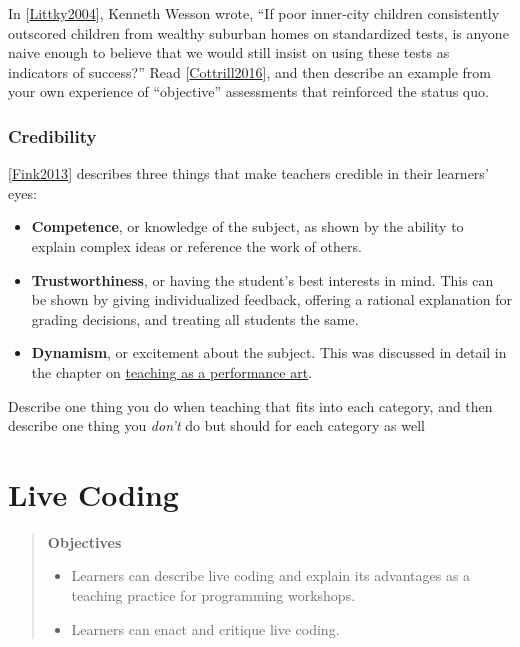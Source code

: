 \documentclass[10pt,statementpaper]{memoir}
\providecommand{\tightlist}{%
  \setlength{\itemsep}{0pt}\setlength{\parskip}{0pt}}
\begin{document}
In {[}\href{biblio.html\#littky-big-picture}{Littky2004}{]}, Kenneth
Wesson wrote, ``If poor inner-city children consistently outscored
children from wealthy suburban homes on standardized tests, is anyone
naive enough to believe that we would still insist on using these tests
as indicators of success?'' Read
{[}\href{biblio.html\#cottrill-gifted}{Cottrill2016}{]}, and then
describe an example from your own experience of ``objective''
assessments that reinforced the status quo.

\subsection*{Credibility}\label{credibility}

{[}\href{biblio.html\#fink-significant}{Fink2013}{]} describes three
things that make teachers credible in their learners' eyes:

\begin{itemize}
\item
  \textbf{Competence}, or knowledge of the subject, as shown by the
  ability to explain complex ideas or reference the work of others.
\item
  \textbf{Trustworthiness}, or having the student's best interests in
  mind. This can be shown by giving individualized feedback, offering a
  rational explanation for grading decisions, and treating all students
  the same.
\item
  \textbf{Dynamism}, or excitement about the subject. This was discussed
  in detail in the chapter on \href{performance.html}{teaching as a
  performance art}.
\end{itemize}

Describe one thing you do when teaching that fits into each category,
and then describe one thing you \emph{don't} do but should for each
category as well

\chapter{Live Coding}\label{live-coding}

\begin{quote}
\textbf{Objectives}

\begin{itemize}
\tightlist
\item
  Learners can describe live coding and explain its advantages as a
  teaching practice for programming workshops.
\item
  Learners can enact and critique live coding.
\end{itemize}
\end{quote}
\end{document}
